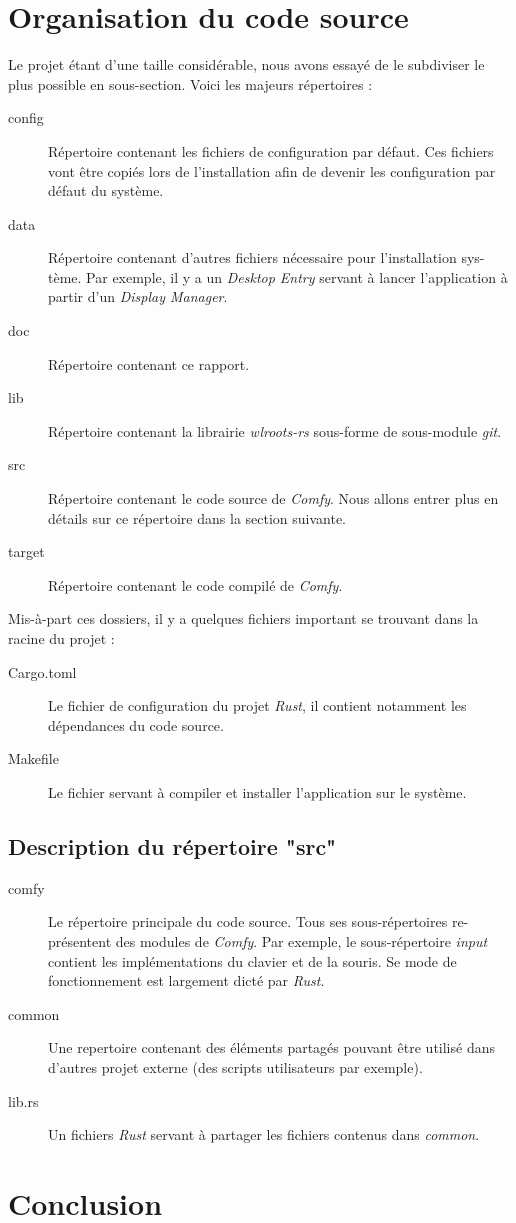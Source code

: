 \documentclass[titlepage]{article}
\begin{document}
\section{Organisation du code source}
Le projet étant d'une taille considérable, nous avons essayé de le subdiviser le plus possible en sous-section. Voici les majeurs répertoires :
\begin{description}
	\item [config] Répertoire contenant les fichiers de configuration par défaut. Ces fichiers vont être copiés lors de l'installation afin de devenir les configuration par défaut du système.
	\item [data] Répertoire contenant d'autres fichiers nécessaire pour l'installation sys-tème. Par exemple, il y a un \textit{Desktop Entry} servant à lancer l'application à partir d'un \textit{Display Manager}.
	\item [doc] Répertoire contenant ce rapport.
	\item [lib] Répertoire contenant la librairie \textit{wlroots-rs} sous-forme de sous-module \textit{git}.
	\item [src] Répertoire contenant le code source de \textit{Comfy}. Nous allons entrer plus en détails sur ce répertoire dans la section suivante.
	\item [target] Répertoire contenant le code compilé de \textit{Comfy}.
\end{description}

Mis-à-part ces dossiers, il y a quelques fichiers important se trouvant dans la racine du projet :
\begin{description}
	\item [Cargo.toml] Le fichier de configuration du projet \textit{Rust}, il contient notamment les dépendances du code source.
	\item [Makefile] Le fichier servant à compiler et installer l'application sur le système.
\end{description}
\subsection{Description du répertoire "src"}
\begin{description}
	\item [comfy] Le répertoire principale du code source. Tous ses sous-répertoires re-présentent des modules de \textit{Comfy}. Par exemple, le sous-répertoire \textit{input} contient les implémentations du clavier et de la souris. Se mode de fonctionnement est largement dicté par \textit{Rust}.
	\item [common] Une repertoire contenant des éléments partagés pouvant être utilisé dans d'autres projet externe (des scripts utilisateurs par exemple).
	\item [lib.rs] Un fichiers \textit{Rust} servant à partager les fichiers contenus dans \textit{common}.
\end{description}
\section{Conclusion}
\end{document}
